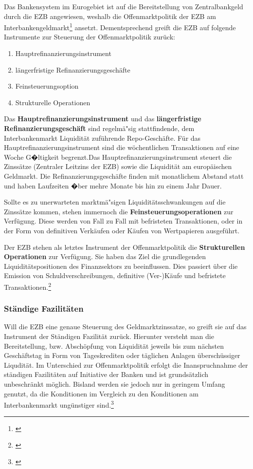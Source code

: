\documentclass[
        onecolumn,
        a4paper,
        abstracton,
        parskip=half
        ,final
        ]{scrartcl}
\begin{document}
Das Bankensystem im Eurogebiet ist auf die Bereitstellung von Zentralbankgeld durch die EZB angewiesen, weshalb die Offenmarktpolitik der EZB am Interbankengeldmarkt\footnote[53]{\citep[vgl.][S.558f]{Basseler2010}} ansetzt. Dementsprechend greift die EZB auf folgende Instrumente zur Steuerung der Offenmarktpolitik zur{\"u}ck:
\begin{enumerate}
 \item{Hauptrefinanzierungsinstrument}
 \item{l{\"a}ngerfristige Refinanzierungsgesch{\"a}fte}
 \item{Feinsteuerungsoption}
 \item{Strukturelle Operationen}
 \end{enumerate}

Das \textbf{Hauptrefinanzierungsinstrument} und das \textbf{l{\"a}ngerfristige Refinanzierungsgesch{\"a}ft} sind regelm{\"a}{"s}ig stattfindende, dem Interbankenmarkt Liquidit{\"a}t zuf{\"u}hrende Repo-Gesch{\"a}fte.
F{\"u}r das Hauptrefinanzierungsinstrument sind die w{\"o}chentlichen Transaktionen auf eine Woche G�ltigkeit begrenzt.Das Hauptrefinanzierungsinstrument steuert die Zinss{\"a}tze (Zentraler Leitzins der EZB) sowie die Liquidit{\"a}t am europ{\"a}ischen Geldmarkt. Die Refinanzierungsgesch{\"a}fte finden mit monatlichem Abstand statt und haben  Laufzeiten �ber mehre Monate bis hin zu einem Jahr Dauer.


Sollte es zu unerwarteten marktm{\"a}{"s}igen Liquidit{\"a}tsschwankungen auf die Zinss{\"a}tze kommen, stehen immernoch die \textbf{Feinsteuerungsoperationen} zur Verf{\"u}gung. Diese werden von Fall zu Fall mit befristeten Transaktionen, oder in der Form von definitiven Verk{\"a}ufen oder K{\"a}ufen von Wertpapieren ausgef{\"u}hrt.

Der EZB stehen als letztes Instrument der Offenmarktpolitik die \textbf{Strukturellen Operationen} zur Verf{\"u}gung. Sie haben das Ziel die grundlegenden Liquidit{\"a}tspositionen des Finanzsektors zu beeinflussen. Dies passiert {\"u}ber die Emission von Schuldverschreibungen, definitive (Ver-)K{\"a}ufe und befristete Transaktionen.\footnote[58]{\citep[S.560]{Basseler2010}}

\subsubsection{St{\"a}ndige Fazilit{\"a}ten}

Will die EZB eine genaue Steuerung des Geldmarktzinssatze, so greift sie auf das Instrument der St{\"a}ndigen Fazilit{\"a}t zur{\"u}ck. Hierunter versteht man die Bereitstellung, bzw. Absch{\"o}pfung von Liquidit{\"a}t jeweils bis zum n{\"a}chsten Gesch{\"a}ftstag in Form von Tageskrediten oder t{\"a}glichen Anlagen {\"u}bersch{\"u}ssiger Liqudit{\"a}t. Im Unterschied zur Offenmarktpolitik erfolgt die Inanspruchnahme der st{\"a}ndigen Fazilit{\"a}ten auf Initiative der Banken und ist grunds{\"a}tzlich unbeschr{\"a}nkt m{\"o}glich. Bisland werden sie jedoch nur in geringem Umfang genutzt, da die Konditionen im Vergleich zu den Konditionen am Interbankenmarkt ung{\"u}nstiger sind.\footnote[59]{\citep[vgl.][S.560ff]{Basseler2010}}
\end{document}
